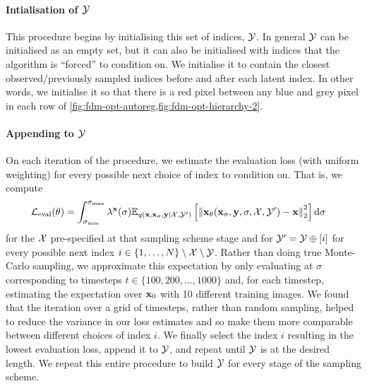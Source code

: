 \paragraph{Intialisation of $\mathcal{Y}$}
This procedure begins by initialising this set of indices, $\mathcal{Y}$. In general $\mathcal{Y}$ can be initialised as an empty set, but it can also be initialised with indices that the algorithm is ``forced'' to condition on. We initialise it to contain the closest observed/previously sampled indices before and after each latent index. In other words, we initialise it so that there is a red pixel between any blue and grey pixel in each row of \cref{fig:fdm-opt-autoreg,fig:fdm-opt-hierarchy-2}.

\paragraph{Appending to $\mathcal{Y}$}
On each iteration of the procedure, we estimate the evaluation loss (with uniform weighting) for every possible next choice of index to condition on. That is, we compute
\begin{align}
    \mathcal{L}_\text{eval}(\theta) &= \int_{\sigma_\text{min}}^{\sigma_\text{max}} \lambda^{\mathbf{x}}(\sigma) \mathbb{E}_{q({\mathbf{x}}, {\mathbf{x}}_\sigma, {\mathbf{y}}|{\mathcal{X}}, {\mathcal{Y}}')} \left[ 
    \left\| {\mathbf{x}}_\theta({\mathbf{x}}_\sigma, {\mathbf{y}}, \sigma, {\mathcal{X}}, {\mathcal{Y}}') - {\mathbf{x}} \right\|_2^2 \right] \mathrm{d}\sigma
\end{align}
for the ${\mathcal{X}}$ pre-specified at that sampling scheme stage and for ${\mathcal{Y}}' = {\mathcal{Y}} \oplus [i]$ for every possible next index ${i\in\{1,\ldots,N\}\setminus\mathcal{X}\setminus\mathcal{Y}}$.
Rather than doing true Monte-Carlo sampling, we approximate this expectation by only evaluating at $\sigma$ corresponding to timesteps ${t \in \{100,200,\ldots,1000\}}$ and, for each timestep, estimating the expectation over ${\mathbf{x}}_0$ with 10 different training images. We found that the iteration over a grid of timesteps, rather than random sampling, helped to reduce the variance in our loss estimates and so make them more comparable between different choices of index $i$. We finally select the index $i$ resulting in the lowest evaluation loss, append it to $\mathcal{Y}$, and repeat until $\mathcal{Y}$ is at the desired length. We repeat this entire procedure to build ${\mathcal{Y}}$ for every stage of the sampling scheme.

